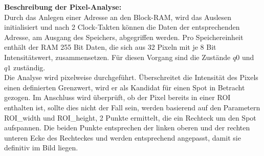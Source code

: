 \textbf{Beschreibung der Pixel-Analyse:}\\
Durch das Anlegen einer Adresse an den Block-RAM, wird das Auslesen initialisiert und nach 2 Clock-Takten können die Daten der entsprechenden Adresse, am Ausgang des Speichers,  abgegriffen werden.
Pro Speichereinheit enthält der RAM 255 Bit Daten, die sich aus 32 Pixeln mit je 8 Bit Intensitätswert, zusammensetzen. Für diesen Vorgang sind die Zustände $q0$ und $q1$ zuständig.\\
Die Analyse wird pixelweise durchgeführt. Überschreitet die Intensität des Pixels einen definierten Grenzwert, wird er als Kandidat für einen Spot in Betracht gezogen. Im Anschluss wird überprüft, ob der Pixel bereits in einer ROI enthalten ist, sollte dies nicht der Fall sein, werden basierend auf den Parametern ROI\_width und ROI\_height, 2 Punkte ermittelt, die ein Rechteck um den Spot aufspannen. Die beiden Punkte entsprechen der linken oberen und der rechten unteren Ecke des Rechteckes und werden entsprechend angepasst, damit sie definitiv im Bild liegen.



